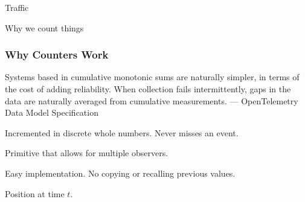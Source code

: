 
\begin{frame}[standout]
    Traffic

    \small{Why we count things}
\end{frame}


\begin{frame}
    \frametitle{Why Counters Work}

    \begin{quotebox}
         Systems based in cumulative monotonic sums are naturally simpler, in
         terms of the cost of adding reliability. When collection fails
         intermittently, gaps in the data are naturally averaged from
         cumulative measurements.
         \tcblower
         \hfill --- OpenTelemetry Data Model Specification
    \end{quotebox}

    \begin{description}[labelwidth=\widthof{Synchronization}]
        \item[Accurate] Incremented in discrete whole numbers.  Never misses an event.
        \item[Synchronization] Primitive that allows for multiple observers.
        \item[Low Overhead] Easy implementation.  No copying or recalling previous values.
        \item[Fundamental] Position at time $t$.
    \end{description}

\end{frame}

